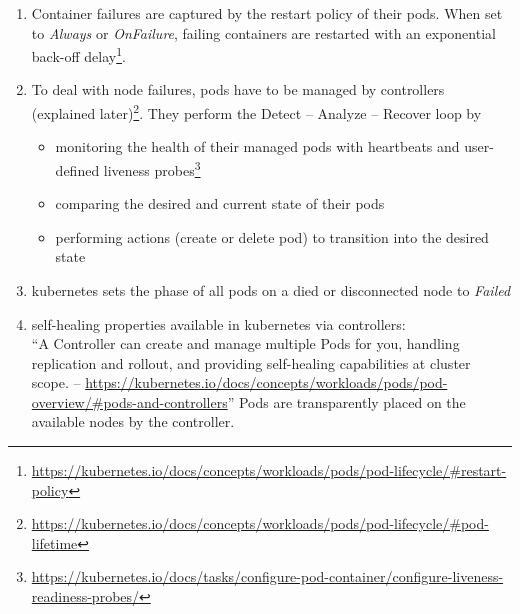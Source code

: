   \begin{enumerate}
    \item Container failures are captured by the restart policy of their pods. When set to \textit{Always} or \textit{OnFailure}, failing containers are restarted with an exponential back-off delay\footnote{\url{https://kubernetes.io/docs/concepts/workloads/pods/pod-lifecycle/\#restart-policy}}.
    \item To deal with node failures, pods have to be managed by controllers (explained later)\footnote{\url{https://kubernetes.io/docs/concepts/workloads/pods/pod-lifecycle/\#pod-lifetime}}. They perform the Detect -- Analyze -- Recover loop by
      \begin{itemize}
        \item monitoring the health of their managed pods with heartbeats and user-defined liveness probes\footnote{\url{https://kubernetes.io/docs/tasks/configure-pod-container/configure-liveness-readiness-probes/}}
        \item comparing the desired and current state of their pods
        \item performing actions (create or delete pod) to transition into the desired state
      \end{itemize}
    \item \gls{kubernetes} sets the phase of all pods on a died or disconnected node to \textit{Failed}
    \item self-healing properties available in \gls{kubernetes} via controllers:\hfill\\
          \enquote{A Controller can create and manage multiple Pods for you, handling replication and rollout, and providing self-healing capabilities at cluster scope. -- \url{https://kubernetes.io/docs/concepts/workloads/pods/pod-overview/\#pods-and-controllers}}
          Pods are transparently placed on the available nodes by the controller.


\end{enumerate}
